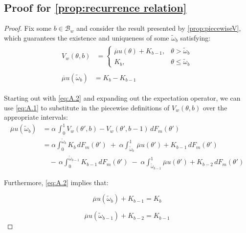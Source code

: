 \subsection{Proof for \autoref{prop:recurrence relation}} 
\begin{proof} 
Fix some $b\in\mathcal{B}_w$ and consider the result presented by \autoref{prop:piecewiseV}, which guarantees the existence and uniqueness of some $\widetilde \omega_b$ satisfying:
\begin{align}
    \begin{split}\label{eq:A.1}
        V_w(\theta, b)&=\begin{cases} 
            \overline\mu u(\theta) + K_{b-1},& \theta> \widetilde \omega_b \\
            K_b,& \theta\leq\widetilde \omega_b
        \end{cases}
    \end{split}\\ 
    \begin{split}\label{eq:A.2}
        \overline\mu u(\widetilde\omega_b) &= K_b-K_{b-1}
    \end{split} 
\end{align}  

Starting out with \autoref{eq:A.2} and expanding out the expectation operator, we can use \eqref{eq:A.1} to substitute in the piecewise definitions of $V_w(\theta,b)$ over the appropriate intervals: 
\begin{equation}\label{eq:A.3}
    \begin{split}
        \overline\mu u(\widetilde\omega_b) &= \alpha \,\int^1_0 V_w(\theta',b)-V_w(\theta',b-1)\,dF_m(\theta')\\
                                           &=\alpha \int^{\widetilde\omega_b}_0 K_b\,dF_m(\theta') \;+\; \alpha \int^1_{\widetilde\omega_b}\,\overline\mu u(\theta') + K_{b-1}\,dF_m(\theta')\\ 
                                           & \quad -\,\alpha \int^{\widetilde\omega_{b-1}}_0 K_{b-1}\,dF_m(\theta') \;-\; \alpha \int^1_{\widetilde\omega_{b-1}} \overline\mu u(\theta') + K_{b-2}\,dF_m(\theta')
    \end{split}
\end{equation}

Furthermore, \autoref{eq:A.2} implies that:

$$
\overline\mu u(\widetilde\omega_b) +K_{b-1}= K_b
$$

$$
\overline\mu u(\widetilde\omega_{b-1}) +K_{b-2}=K_{b-1}
$$


\end{proof}
